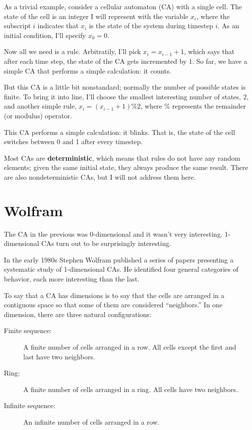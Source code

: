 \documentclass[10pt]{book}
\begin{document}
As a trivial example, consider a cellular automaton (CA) with
a single cell.  The state of the cell is an integer I will represent
with the variable $x_i$, where the subscript $i$ indicates
that $x_i$ is the state of the system during timestep $i$.
As an initial condition, I'll specify $x_0 = 0$.

Now all we need is a rule.  Arbitratily, I'll pick $x_i = x_{i-1} + 1$,
which says that after each time step, the state of the CA gets
incremented by 1.  So far, we have a simple CA that performs
a simple calculation: it counts.

But this CA is a little bit nonstandard; normally the number of
possible states is finite.  To bring it into line, I'll choose the
smallest interesting number of states, 2, and another simple rule,
$x_i = (x_{i-1} + 1) \% 2$, where $\%$ represents the remainder (or
modulus) operator.

This CA performs a simple calculation: it blinks.  That is,
the state of the cell switches between 0 and 1 after every timestep.

Most CAs are {\bf deterministic}, which means that rules do not
have any random elements; given the same initial state, they
always produce the same result.  There are also nondeterministic
CAs, but I will not address them here.



\section{Wolfram}

The CA in the previous was 0-dimensional and it wasn't very
interesting.  1-dimensional CAs turn out to be surprisingly
interesting.

In the early 1980s Stephen Wolfram published a series of papers
presenting a systematic study of 1-dimensional CAs.  He identified
four general categories of behavior, each more interesting than
the last.

To say that a CA has dimensions is to say that the cells are
arranged in a contiguous space so that some of them are
considered ``neighbors.''  In one dimension, there are three
natural configurations:

\begin{description}

\item[Finite sequence:] A finite number of cells arranged
in a row.  All cells except the first and last have two neighbors.

\item[Ring:] A finite number of cells arranged
in a ring.  All cells have two neighbors.

\item[Infinite sequence:] An infinite number of cells arranged
in a row.

\end{description}
\end{document}
